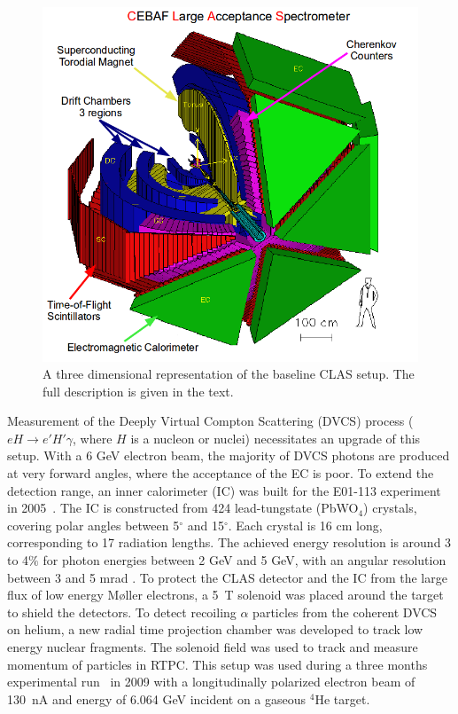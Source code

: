\documentclass[preprint,5p]{elsarticle}
\begin{document}
\begin{figure}[tbp]
\centering \includegraphics[scale=0.3]{fig/test_clas.png}
\caption{A three dimensional representation of the baseline CLAS setup. The
   full description is given in the text.} \label{fig:CLAS}
\end{figure}

Measurement of the Deeply Virtual Compton Scattering (DVCS) process
($eH \rightarrow e' H' \gamma$, where $H$ is a nucleon or nuclei) necessitates an upgrade
of this setup.  With a 6 GeV electron beam, the majority of DVCS photons are produced
at very forward angles, where the acceptance of the EC is poor. To extend the detection range,
an inner calorimeter (IC) was built for the E01-113 experiment in 2005~\cite{FX}.
The IC is constructed from 424 lead-tungstate (PbWO$_{4}$) crystals, covering polar 
angles between 5$^{\circ}$ and 15$^{\circ}$. Each crystal is 16 cm long, corresponding
to 17 radiation lengths. The achieved energy resolution is around 3 to 4$\%$ for photon
energies between 2 GeV and 5 GeV, with an angular resolution between 3 and 5 mrad 
\cite{Hyon-suk}. To protect the CLAS detector and the IC from the large flux 
of low energy M{\o}ller 
electrons, a 5~T solenoid was placed around the target to shield the detectors. 
To detect recoiling $\alpha$ particles from the coherent DVCS on helium, a new 
radial time projection chamber was developed to track low energy nuclear 
fragments. The solenoid field was used to track and measure momentum of 
particles in RTPC. This 
setup was used during a three months experimental run~\cite{proposal1,proposal2}
in 2009 with a longitudinally polarized electron beam of 130~nA 
and energy of 6.064 GeV incident on a gaseous $^{4}$He target.
\end{document}
